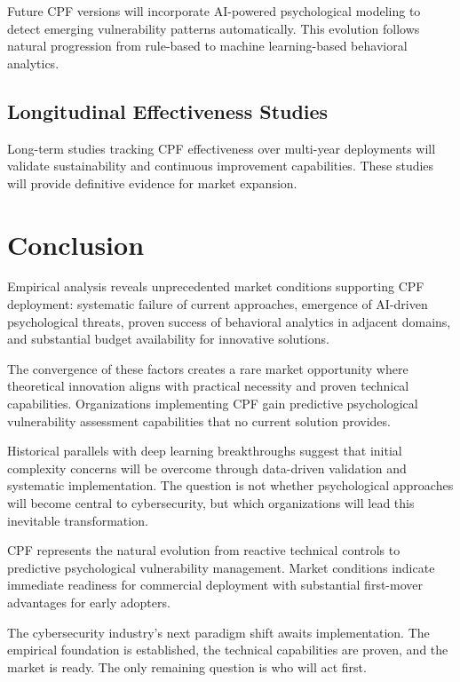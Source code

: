 \documentclass[11pt,a4paper]{article}
\begin{document}
Future CPF versions will incorporate AI-powered psychological modeling to detect emerging vulnerability patterns automatically. This evolution follows natural progression from rule-based to machine learning-based behavioral analytics.

\subsection{Longitudinal Effectiveness Studies}

Long-term studies tracking CPF effectiveness over multi-year deployments will validate sustainability and continuous improvement capabilities. These studies will provide definitive evidence for market expansion.

\section{Conclusion}

Empirical analysis reveals unprecedented market conditions supporting CPF deployment: systematic failure of current approaches, emergence of AI-driven psychological threats, proven success of behavioral analytics in adjacent domains, and substantial budget availability for innovative solutions.

The convergence of these factors creates a rare market opportunity where theoretical innovation aligns with practical necessity and proven technical capabilities. Organizations implementing CPF gain predictive psychological vulnerability assessment capabilities that no current solution provides.

Historical parallels with deep learning breakthroughs suggest that initial complexity concerns will be overcome through data-driven validation and systematic implementation. The question is not whether psychological approaches will become central to cybersecurity, but which organizations will lead this inevitable transformation.

CPF represents the natural evolution from reactive technical controls to predictive psychological vulnerability management. Market conditions indicate immediate readiness for commercial deployment with substantial first-mover advantages for early adopters.

The cybersecurity industry's next paradigm shift awaits implementation. The empirical foundation is established, the technical capabilities are proven, and the market is ready. The only remaining question is who will act first.
\end{document}
